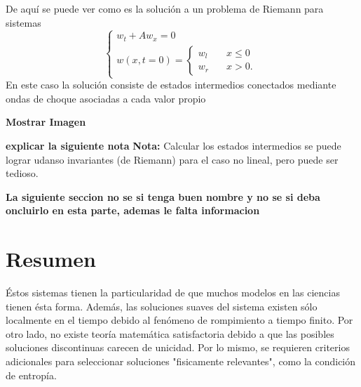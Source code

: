 De aquí se puede ver como es la solución a un problema de Riemann para sistemas
\[
\begin{cases}
w_t + A w_x = 0 \\
w(x, t=0) = \begin{cases}
			w_l &\quad x \leq 0 \\
			w_r &\quad x > 0. 
			\end{cases}
\end{cases}
\]
En este caso la solución consiste de estados intermedios conectados mediante ondas de choque asociadas a cada valor propio

\textbf{Mostrar Imagen}

\textbf{explicar la siguiente nota}
\textbf{Nota: } Calcular los estados intermedios se puede lograr udanso invariantes (de Riemann) para el caso no lineal, pero puede ser tedioso.


\textbf{La siguiente seccion no se si tenga buen nombre y no se si deba oncluirlo en esta parte, ademas le falta informacion}

\section{Resumen}
Éstos sistemas tienen la particularidad de que muchos modelos en las ciencias tienen ésta forma. Además, las soluciones suaves del sistema existen sólo localmente en el tiempo debido al fenómeno de rompimiento a tiempo finito. Por otro lado, no existe teoría matemática satisfactoria debido a que las posibles soluciones discontinuas carecen de unicidad. Por lo mismo, se requieren criterios adicionales para seleccionar soluciones "fisicamente relevantes", como la condición de entropía.
